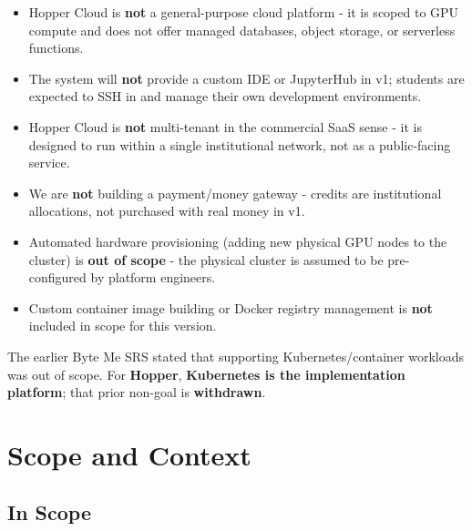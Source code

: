 \documentclass[12pt,a4paper]{article}
\begin{document}
\begin{itemize}[leftmargin=1.5em]
  \item Hopper Cloud is \textbf{not} a general-purpose cloud platform - it is scoped to GPU compute and does not offer managed databases, object storage, or serverless functions.
  \item The system will \textbf{not} provide a custom IDE or JupyterHub in v1; students are expected to SSH in and manage their own development environments.
  \item Hopper Cloud is \textbf{not} multi-tenant in the commercial SaaS sense - it is designed to run within a single institutional network, not as a public-facing service.
  \item We are \textbf{not} building a payment/money gateway - credits are institutional allocations, not purchased with real money in v1.
  \item Automated hardware provisioning (adding new physical GPU nodes to the cluster) is \textbf{out of scope} - the physical cluster is assumed to be pre-configured by platform engineers.
  \item Custom container image building or Docker registry management is \textbf{not} included in scope for this version.
\end{itemize}

\begin{notebox}
The earlier Byte Me SRS stated that supporting Kubernetes/container workloads was out of scope. For \textbf{Hopper}, \textbf{Kubernetes is the implementation platform}; that prior non-goal is \textbf{withdrawn}.
\end{notebox}

\newpage
\section{Scope and Context}

\subsection{In Scope}
\end{document}
